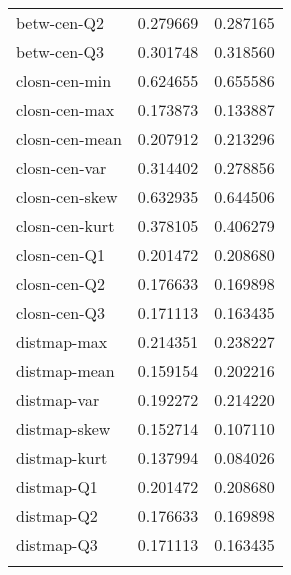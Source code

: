 \begin{longtable}{lrr}
	betw-cen-Q2                   &  0.279669 &  0.287165 \\
	betw-cen-Q3                   &  0.301748 &  0.318560 \\
	closn-cen-min                 &  0.624655 &  0.655586 \\
	closn-cen-max                 &  0.173873 &  0.133887 \\
	closn-cen-mean                &  0.207912 &  0.213296 \\
	closn-cen-var                 &  0.314402 &  0.278856 \\
	closn-cen-skew                &  0.632935 &  0.644506 \\
	closn-cen-kurt                &  0.378105 &  0.406279 \\
	closn-cen-Q1                  &  0.201472 &  0.208680 \\
	closn-cen-Q2                  &  0.176633 &  0.169898 \\
	closn-cen-Q3                  &  0.171113 &  0.163435 \\
	distmap-max                   &  0.214351 &  0.238227 \\
	distmap-mean                  &  0.159154 &  0.202216 \\
	distmap-var                   &  0.192272 &  0.214220 \\
	distmap-skew                  &  0.152714 &  0.107110 \\
	distmap-kurt                  &  0.137994 &  0.084026 \\
	distmap-Q1                    &  0.201472 &  0.208680 \\
	distmap-Q2                    &  0.176633 &  0.169898 \\
	distmap-Q3                    &  0.171113 &  0.163435 \\
	\label{tab:results-stats}
\end{longtable}

